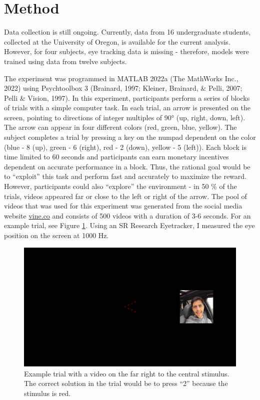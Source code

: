 \documentclass[
  man]{apa6}
\begin{document}
\hypertarget{method}{%
\section{Method}\label{method}}

Data collection is still ongoing. Currently, data from 16 undergraduate students, collected at the University of Oregon, is available for the current analysis. However, for four subjects, eye tracking data is missing - therefore, models were trained using data from twelve subjects.

The experiment was programmed in MATLAB 2022a (The MathWorks Inc., 2022) using Psychtoolbox 3 (Brainard, 1997; Kleiner, Brainard, \& Pelli, 2007; Pelli \& Vision, 1997). In this experiment, participants perform a series of blocks of trials with a simple computer task. In each trial, an arrow is presented on the screen, pointing to directions of integer multiples of 90° (up, right, down, left). The arrow can appear in four different colors (red, green, blue, yellow). The subject completes a trial by pressing a key on the numpad dependent on the color (blue - 8 (up), green - 6 (right), red - 2 (down), yellow - 5 (left)). Each block is time limited to 60 seconds and participants can earn monetary incentives dependent on accurate performance in a block. Thus, the rational goal would be to ``exploit'' this task and perform fast and accurately to maximize the reward. However, participants could also ``explore'' the environment - in 50 \% of the trials, videos appeared far or close to the left or right of the arrow. The pool of videos that was used for this experiment was generated from the social media website \href{www.vine.co}{vine.co} and consists of 500 videos with a duration of 3-6 seconds. For an example trial, see Figure \ref{fig:task}. Using an SR Research Eyetracker, I measured the eye position on the screen at 1000 Hz.

\begin{figure}
\centering
\includegraphics{task.png}
\caption{\label{fig:task} Example trial with a video on the far right to the central stimulus. The correct solution in the trial would be to press ``2'' because the stimulus is red.}
\end{figure}
\end{document}
